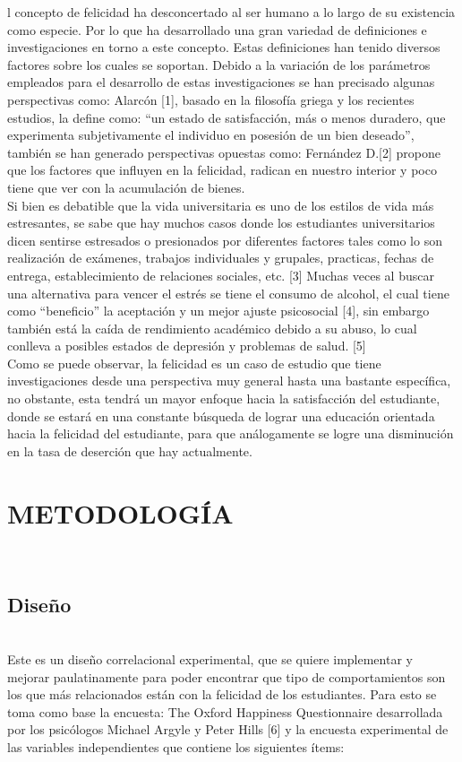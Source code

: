 \documentclass[conference]{IEEEtran}
\begin{document}
l  concepto de felicidad ha desconcertado al ser humano a lo largo de su existencia como especie. Por lo que ha desarrollado una gran variedad de definiciones e investigaciones en torno a este concepto. Estas definiciones han tenido diversos factores sobre los cuales se soportan. Debido a la variación de los parámetros empleados para el desarrollo de estas investigaciones se han precisado algunas perspectivas como: Alarcón [1], basado en la filosofía griega y los recientes estudios, la define como: “un estado de satisfacción, más o menos duradero, que experimenta subjetivamente el individuo en posesión de un bien deseado”, también se han generado perspectivas opuestas como: Fernández D.[2] propone que los factores que influyen en la felicidad, radican en nuestro interior y poco tiene que ver con la acumulación de bienes. \\
   Si bien es debatible que la vida universitaria es uno de los estilos de vida más estresantes, se sabe que hay muchos casos donde los estudiantes universitarios dicen sentirse estresados o presionados por diferentes factores tales como lo son realización de exámenes, trabajos individuales y grupales, practicas, fechas de entrega, establecimiento de relaciones sociales, etc. [3] Muchas veces al buscar una alternativa para vencer el estrés se tiene el consumo de alcohol, el cual tiene como “beneficio” la aceptación y un mejor ajuste psicosocial [4], sin embargo también está la caída de rendimiento académico debido a su abuso, lo cual conlleva a posibles estados de depresión y problemas de salud. [5]\\

   Como se puede observar, la felicidad es un caso de estudio que tiene investigaciones desde una perspectiva muy general hasta una bastante específica, no obstante, esta tendrá un mayor enfoque hacia la satisfacción del estudiante, donde se estará en una constante búsqueda de lograr una educación orientada hacia la felicidad del estudiante, para que análogamente se logre una disminución en la tasa de deserción que hay actualmente. \\


\section{METODOLOGÍA}\\
\subsection{Diseño}\\
   Este es un diseño correlacional experimental, que se quiere implementar y mejorar paulatinamente para poder encontrar que tipo de comportamientos son los que más relacionados están con la felicidad de los estudiantes. Para esto se toma como base la encuesta: The Oxford Happiness Questionnaire desarrollada por los psicólogos Michael Argyle y Peter Hills [6] y la encuesta experimental de las variables independientes que contiene los siguientes ítems:\\
   
\end{document}
